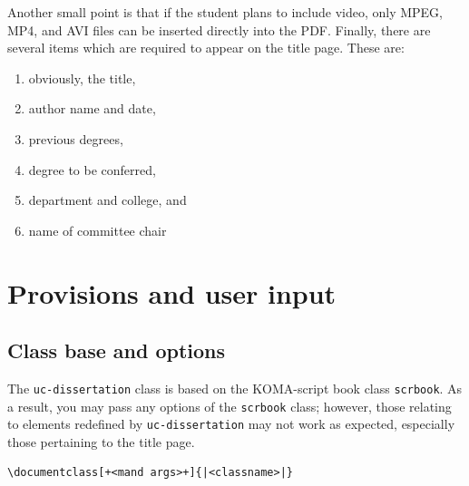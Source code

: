 \documentclass{article}
\begin{document}
Another small point is that if the student plans to include video, only MPEG, MP4, and AVI files can be inserted directly into the PDF.
Finally, there are several items which are required to appear on the title page. These are:
\begin{multicols}{2}
  \begin{enumerate}\itemsep0pt
  \item obviously, the title,
  \item author name and date,
  \item previous degrees,
  \item degree to be conferred,
  \item department and college, and
  \item name of committee chair
  \end{enumerate}
\end{multicols}

\section{Provisions and user input}

\subsection{Class base and options}

The \verb+uc-dissertation+ class is based on the KOMA-script book class \verb+scrbook+. 
As a result, you may pass any options of the \verb+scrbook+ class; however, those relating to elements redefined by \verb+uc-dissertation+ may not work as expected, especially those pertaining to the title page. 


\begin{lstlisting}
\documentclass[+<mand args>+]{|<classname>|}
\end{lstlisting}
\end{document}
